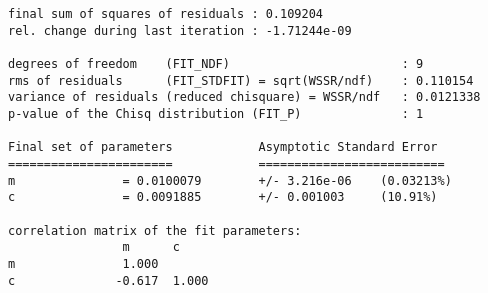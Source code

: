     \begin{verbatim}
final sum of squares of residuals : 0.109204
rel. change during last iteration : -1.71244e-09

degrees of freedom    (FIT_NDF)                        : 9
rms of residuals      (FIT_STDFIT) = sqrt(WSSR/ndf)    : 0.110154
variance of residuals (reduced chisquare) = WSSR/ndf   : 0.0121338
p-value of the Chisq distribution (FIT_P)              : 1

Final set of parameters            Asymptotic Standard Error
=======================            ==========================
m               = 0.0100079        +/- 3.216e-06    (0.03213%)
c               = 0.0091885        +/- 0.001003     (10.91%)

correlation matrix of the fit parameters:
                m      c      
m               1.000 
c              -0.617  1.000 
    \end{verbatim}